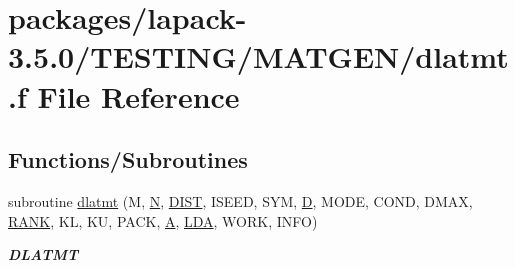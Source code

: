 \hypertarget{dlatmt_8f}{}\section{packages/lapack-\/3.5.0/\+T\+E\+S\+T\+I\+N\+G/\+M\+A\+T\+G\+E\+N/dlatmt.f File Reference}
\label{dlatmt_8f}
\subsection*{Functions/\+Subroutines}
\begin{DoxyCompactItemize}
\item 
subroutine \hyperlink{group__double__matgen_gabf8567d631c6df83a8e336aec741bc77}{dlatmt} (M, \hyperlink{polmisc_8c_a0240ac851181b84ac374872dc5434ee4}{N}, \hyperlink{superlu__enum__consts_8h_af00a42ecad444bbda75cde1b64bd7e72ac04fbbdf0d80a4ad25e565541deeebd7}{D\+I\+S\+T}, I\+S\+E\+E\+D, S\+Y\+M, \hyperlink{odrpack_8h_a7dae6ea403d00f3687f24a874e67d139}{D}, M\+O\+D\+E, C\+O\+N\+D, D\+M\+A\+X, \hyperlink{splinemodule_8c_a3a88bcc63386de30443dacede2e01847}{R\+A\+N\+K}, K\+L, K\+U, P\+A\+C\+K, \hyperlink{classA}{A}, \hyperlink{example__user_8c_ae946da542ce0db94dced19b2ecefd1aa}{L\+D\+A}, W\+O\+R\+K, I\+N\+F\+O)
\begin{DoxyCompactList}\small\item\em {\bfseries D\+L\+A\+T\+M\+T} \end{DoxyCompactList}\end{DoxyCompactItemize}
